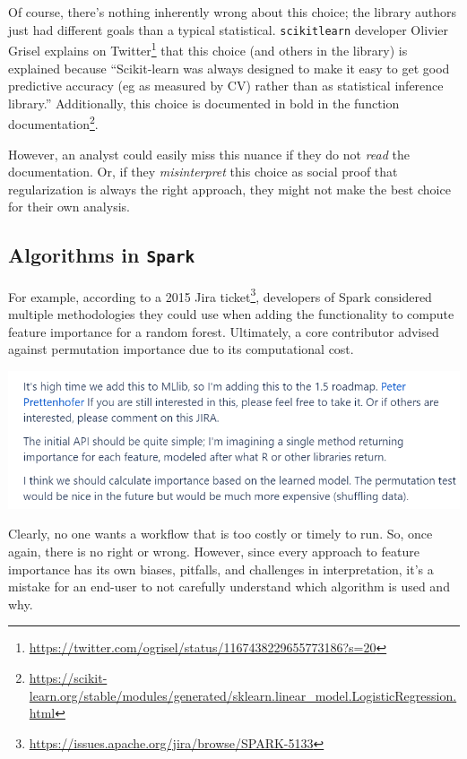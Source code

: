 \documentclass[
]{krantz}
\renewcommand{\href}[2]{#2\footnote{\url{#1}}}
\begin{document}
Of course, there's nothing inherently wrong about this choice; the library authors just had different goals than a typical statistical. \texttt{scikitlearn} developer Olivier Grisel explains \href{https://twitter.com/ogrisel/status/1167438229655773186?s=20}{on Twitter} that this choice (and others in the library) is explained because ``Scikit-learn was always designed to make it easy to get good predictive accuracy (eg as measured by CV) rather than as statistical inference library.'' Additionally, this choice is documented in bold \href{https://scikit-learn.org/stable/modules/generated/sklearn.linear_model.LogisticRegression.html}{in the function documentation}.

However, an analyst could easily miss this nuance if they do not \emph{read} the documentation. Or, if they \emph{misinterpret} this choice as social proof that regularization is always the right approach, they might not make the best choice for their own analysis.

\hypertarget{algorithms-in-spark}{%
\subsection{\texorpdfstring{Algorithms in \texttt{Spark}}{Algorithms in Spark}}\label{algorithms-in-spark}}

For example, according to a 2015 \href{https://issues.apache.org/jira/browse/SPARK-5133}{Jira ticket}, developers of Spark considered multiple methodologies they could use when adding the functionality to compute feature importance for a random forest. Ultimately, a core contributor advised against permutation importance due to its computational cost.

\begin{center}\includegraphics[width=0.9\linewidth]{figures/comp-quan/spark-jira} \end{center}

Clearly, no one wants a workflow that is too costly or timely to run. So, once again, there is no right or wrong. However, since every approach to feature importance has its own biases, pitfalls, and challenges in interpretation, it's a mistake for an end-user to not carefully understand which algorithm is used and why.
\end{document}
